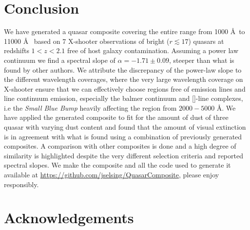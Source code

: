 \documentclass{aa}    %
\newcommand{\sectlabel}[1]{\label{sect:#1}}
\newcommand{\feii}{[\ion{Fe}{ii}]}
\begin{document}
\section{Conclusion}  \sectlabel{conclusion}




We have generated a quasar composite covering the entire range from 1000 \AA~to 11000 \AA~ based on 7 X-shooter observations of bright ($r \lesssim 17$) quasars at redshifts $1 < z < 2.1$ free of host galaxy contamination. Assuming a power law continuum we find a spectral slope of $\alpha = -1.71 \pm 0.09$, steeper than what is found by other authors. We attribute the discrepancy of the power-law slope to the different wavelength coverages, where the very large wavelength coverage on X-shooter ensure that we can effectively choose regions free of emission lines and line continuum emission, especially the balmer continuum and \feii-line complexes, i.e the \textit{Small Blue Bump} heavily affecting the region from $2000 - 5000$ \AA. We have applied the generated composite to fit for the amount of dust of three quasar with varying dust content and found that the amount of visual extinction is in agreement with what is found using a combination of previously generated composites. A comparison with other composites is done and a high degree of similarity is highlighted despite the very different selection criteria and reported spectral slopes. We make the composite and all the code used to generate it available at \url{https://github.com/jselsing/QuasarComposite}, please enjoy responsibly.



\section{Acknowledgements}  \sectlabel{Acknowledgements}







%
 

%
%
\end{document}

